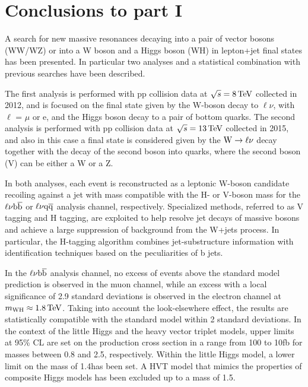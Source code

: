 \chapter{Conclusions to part I}
\label{ch:summary1}

A search for new massive resonances decaying into a pair of vector bosons (WW/WZ) or into a W boson and a Higgs boson (WH)
in lepton+jet final states has been presented. In particular two analyses and a statistical combination with previous searches have been described.

The first analysis is performed with pp collision data at $\sqrt{s} = 8\,\text{Te\hspace{-.08em}V}$ collected in 2012, and is focused on the final state given by the W-boson decay to $\ell\nu$, with $\ell$ = $\mu$ or e,
and the Higgs boson decay to a pair of bottom quarks.
The second analysis is performed with pp collision data at $\sqrt{s} = 13\,\text{Te\hspace{-.08em}V}$ collected in 2015, and also in this case a final state is considered given by the $\mathrm{W}\to\ell\nu$ decay together with the decay of the second boson into quarks, where the second boson (V) can be either a W or a Z. 

In both analyses, each event is reconstructed as a leptonic W-boson candidate recoiling against a jet with mass compatible with the H- or V-boson mass for the $\ell\nu{\mathrm{b}\overline{\mathrm{b}}}$ or $\ell\nu\mathrm{q}\overline{\mathrm{q}}$ analysis channel, respectively.
Specialized methods, referred to as V tagging and H tagging, are exploited to help resolve jet decays of massive bosons and achieve a large suppression of background from the W+jets process.
In particular, the H-tagging algorithm combines jet-substructure information with identification techniques based on the peculiarities of b jets.

In the $\ell\nu{\mathrm{b}\overline{\mathrm{b}}}$ analysis channel, no excess of events above the standard model prediction is observed in the muon channel,
while an excess with a local significance of 2.9 standard deviations is observed in the electron channel at $m_{\rm WH} \approx 1.8\,\text{Te\hspace{-.08em}V}$.
Taking into account the look-elsewhere effect, the results are statistically compatible with the standard model within 2 standard deviations.
In the context of the little Higgs and the heavy vector triplet models, upper limits at 95\% CL are set on the \Wpr production cross section
in a range from 100 to 10\unit{fb} for masses between 0.8 and 2.5\TeV, respectively.
Within the little Higgs model, a lower limit on the \Wpr mass of 1.4\TeV has been set.
A HVT model that mimics the properties of composite Higgs models has been excluded up to a \Wpr mass of 1.5\TeV.

